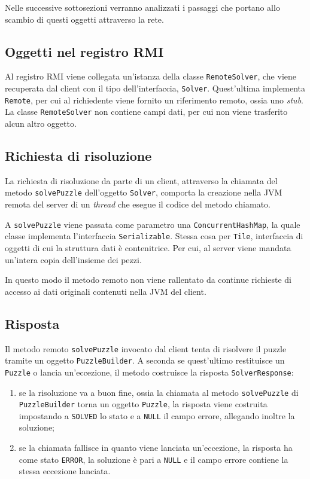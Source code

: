 \documentclass[a4paper, 12pt]{article}
\begin{document}
Nelle successive sottosezioni verranno analizzati i passaggi che portano allo
scambio di questi oggetti attraverso la rete.

\subsection{Oggetti nel registro RMI}
Al registro RMI viene collegata un'istanza della classe \verb|RemoteSolver|, che
viene recuperata dal client con il tipo dell'interfaccia, \verb|Solver|.
Quest'ultima implementa \verb|Remote|, per cui al richiedente viene fornito un
riferimento remoto, ossia uno \emph{stub}. La classe \verb|RemoteSolver| non
contiene campi dati, per cui non viene trasferito alcun altro oggetto.
\subsection{Richiesta di risoluzione}
La richiesta di risoluzione da parte di un client, attraverso la chiamata del
metodo \verb|solvePuzzle| dell'oggetto \verb|Solver|, comporta la creazione
nella JVM remota del server di un \emph{thread} che esegue il codice del
metodo chiamato.

A \verb|solvePuzzle| viene passata come parametro una \verb|ConcurrentHashMap|,
la quale classe implementa l'interfaccia \verb|Serializable|. Stessa cosa per
\verb|Tile|, interfaccia di oggetti di cui la struttura dati è contenitrice. Per
cui, al server viene mandata un'intera copia dell'insieme dei pezzi.

In questo modo il metodo remoto non viene rallentato da continue richieste di
accesso ai dati originali contenuti nella JVM del client.
\subsection{Risposta}
\label{server-response}
Il metodo remoto \verb|solvePuzzle| invocato dal client tenta di risolvere il
puzzle tramite un oggetto \verb|PuzzleBuilder|. A seconda se quest'ultimo
restituisce un \verb|Puzzle| o lancia un'eccezione, il metodo costruisce la
risposta \verb|SolverResponse|:
\begin{enumerate}
\item se la risoluzione va a buon fine, ossia la chiamata al metodo
\verb|solvePuzzle| di \verb|PuzzleBuilder| torna un oggetto \verb|Puzzle|, la
risposta viene costruita impostando a \verb|SOLVED| lo stato e a \verb|NULL| il
campo errore, allegando inoltre la soluzione;
\item se la chiamata fallisce in quanto viene lanciata un'eccezione, la risposta
ha come stato \verb|ERROR|, la soluzione è pari a \verb|NULL| e il campo
errore contiene la stessa eccezione lanciata.
\end{enumerate}
\end{document}
